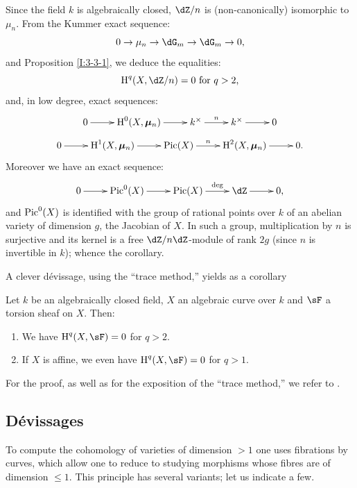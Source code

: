 Since the field $k$ is algebraically closed, $\dZ/n$ is (non-canonically)
isomorphic to $\mu_n$. From the Kummer exact sequence:
\[
  0 \to \mu_n \to \dG_m \to \dG_m \to 0\text{,}
\]
and Proposition \ref{I:3-3-1}, we deduce the equalities:
\[
  \h^q(X,\dZ/n) = 0 \text{ for $q>2$,}
\]
and, in low degree, exact sequences:
\[\xymatrix{
  0 \ar[r] 
    & \h^0(X,\dmu_n) \ar[r] 
    & k^\times \ar[r]^-n 
    & k^\times \ar[r] 
    & 0
}\]
\[\xymatrix{
  0 \ar[r] 
    & \h^1(X,\dmu_n) \ar[r] 
    & \pic(X) \ar[r]^-n 
    & \h^2(X,\dmu_n) \ar[r] 
    & 0\text{.}
}\]
Moreover we have an exact sequence:
\[\xymatrix{
  0 \ar[r] 
    & \pic^0(X) \ar[r] 
    & \pic(X) \ar[r]^-{\deg}
    & \dZ \ar[r] 
    & 0 \text{,}
}\]
and $\operatorname{Pic}^0(X)$ is identified with the group of rational points over $k$ of an
abelian variety of dimension $g$, the Jacobian of $X$. In such a
group, multiplication by $n$ is surjective and its kernel is a
free $\dZ/n\dZ$-module of rank $2g$ (since $n$ is invertible in $k$); whence
the corollary.

A clever d\'evissage, using the ``trace method,'' yields as a corollary 





\begin{proposition}\label{I:3-3-6}
Let $k$ be an algebraically closed field, $X$ an algebraic curve over $k$
and $\sF$ a torsion sheaf on $X$. Then:
\begin{enumerate}[\indent i)]
  \item We have $\h^q(X,\sF) = 0$ for $q>2$.
  \item If $X$ is affine, we even have $\h^q(X,\sF) = 0$ for $q>1$.
\end{enumerate}
\end{proposition}

For the proof, as well as for the exposition of the ``trace
method,'' we refer to \cite[IX 5]{sga4}.










\subsection{D\'evissages}\label{I:3-4}

To compute the cohomology of varieties of dimension $>1$ one uses
fibrations by curves, which allow one to reduce to studying
morphisms whose fibres are of dimension $\leqslant 1$. This principle
has several variants; let us indicate a few.





